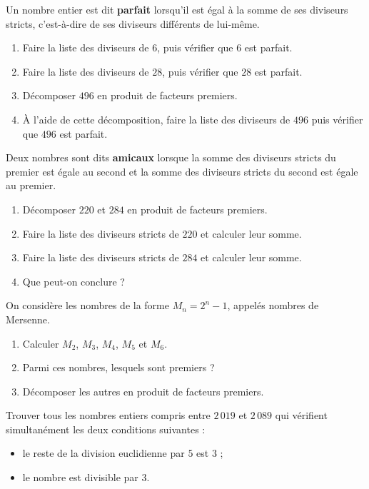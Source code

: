 \documentclass[a4paper,10pt]{report}
\begin{document}
\begin{ex}
Un nombre entier est dit \textbf{parfait} lorsqu'il est égal à la somme de ses diviseurs stricts, c'est-à-dire de ses diviseurs différents de lui-même.
\begin{enumerate}
\item Faire la liste des diviseurs de $6$, puis vérifier que $6$ est parfait.
\item Faire la liste des diviseurs de $28$, puis vérifier que $28$ est parfait.
\item Décomposer $496$ en produit de facteurs premiers.
\item À l'aide de cette décomposition, faire la liste des diviseurs de $496$ puis vérifier que $496$ est parfait.
\end{enumerate}
\end{ex}

\begin{ex}
Deux nombres sont dits \textbf{amicaux} lorsque la somme des diviseurs stricts du premier est égale au second et la somme des diviseurs stricts du second est égale au premier.
\begin{enumerate}
\item Décomposer $220$ et $284$ en produit de facteurs premiers.
\item Faire la liste des diviseurs stricts de $220$ et calculer leur somme.
\item Faire la liste des diviseurs stricts de $284$ et calculer leur somme.
\item Que peut-on conclure ?
\end{enumerate}
\end{ex}

\begin{ex}
On considère les nombres de la forme $M_n=2^n-1$, appelés nombres de Mersenne.
\begin{enumerate}
\item Calculer $M_2$, $M_3$, $M_4$, $M_5$ et $M_6$.
\item Parmi ces nombres, lesquels sont premiers ?
\item Décomposer les autres en produit de facteurs premiers.
\end{enumerate}
\end{ex}

\begin{ex}
Trouver tous les nombres entiers compris entre $2\,019$ et $2\,089$ qui vérifient simultanément les deux conditions suivantes :
\begin{itemize}
\item le reste de la division euclidienne par $5$ est $3$ ;
\item le nombre est divisible par $3$.
\end{itemize}
\end{ex}
\end{document}
